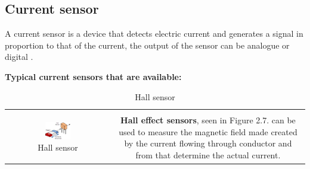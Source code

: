 \vspace{-7mm}
\subsection{Current sensor}
A current sensor is a device that detects electric current and generates a signal in proportion to that of the current, the output of the sensor can be analogue or digital \cite{current_sensor}. 

\textbf{Typical current sensors that are available:}  
\begin{table}[H]
    \centering
    \begin{tabular}{|c|c|}
    \hline
    &\\
      \begin{minipage}[b]{0.45\textwidth}
            \begin{figure}[H]
                \centering
                \includegraphics[width=0.5\textwidth]{Hall_Effect.jpg}
                \caption{Hall sensor}
                \label{fig:hall}
            \end{figure}

      \end{minipage}
         & 
      \begin{minipage}[b]{0.45\textwidth}
           \textbf{Hall effect sensors}, seen in Figure 2.7. can be used to measure the magnetic field made created by the current flowing through conductor and from that determine the actual current. \newline
      \end{minipage}\\


\end{tabular}
\end{table}
